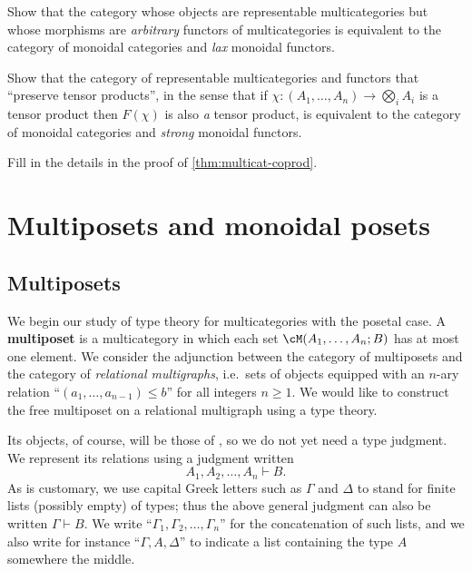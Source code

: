 \documentclass{book}
\let\types\vdash
\let\bigtensor\bigotimes
\begin{document}
\begin{ex}\label{ex:mcat-lax-func}
  Show that the category whose objects are representable multicategories but whose morphisms are \emph{arbitrary} functors of multicategories is equivalent to the category of monoidal categories and \emph{lax} monoidal functors.
\end{ex}

\begin{ex}\label{ex:mcat-strong-func}
  Show that the category of representable multicategories and functors that ``preserve tensor products'', in the sense that if $\chi:(A_1,\dots,A_n) \to \bigtensor_i A_i$ is a tensor product then $F(\chi)$ is also \emph{a} tensor product, is equivalent to the category of monoidal categories and \emph{strong} monoidal functors.
\end{ex}

\begin{ex}\label{ex:multicat-coprod}
  Fill in the details in the proof of \cref{thm:multicat-coprod}.
\end{ex}


\section{Multiposets and monoidal posets}
\label{sec:multiposets-monpos}

\subsection{Multiposets}
\label{sec:multiposets}

We begin our study of type theory for multicategories with the posetal case.
A \textbf{multiposet} is a multicategory in which each set $\cM(A_1,\dots,A_n;B)$ has at most one element.
We consider the adjunction between the category \bMPos of multiposets and the category \bRelMGr of \emph{relational multigraphs}, i.e.\ sets of objects equipped with an $n$-ary relation ``$(a_1,\dots,a_{n-1})\le b$'' for all integers $n\ge 1$.
We would like to construct the free multiposet on a relational multigraph \cG using a type theory.

Its objects, of course, will be those of \cG, so we do not yet need a type judgment.
We represent its relations using a judgment written
\[A_1,A_2,\dots,A_n \types B.\]
As is customary, we use capital Greek letters such as $\Gamma$ and $\Delta$ to stand for finite lists (possibly empty) of types; thus the above general judgment can also be written $\Gamma\types B$.
We write ``$\Gamma_1,\Gamma_2,\dots,\Gamma_n$'' for the concatenation of such lists, and we also write for instance ``$\Gamma,A,\Delta$'' to indicate a list containing the type $A$ somewhere the middle.
\end{document}
